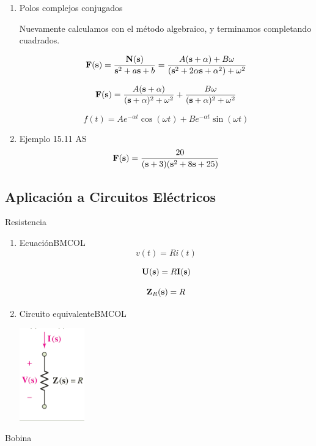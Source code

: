 \begin{enumerate}
\item Polos complejos conjugados
\label{sec:org699cf01}

Nuevamente calculamos con el método algebraico, y terminamos \guillemotleft{}completando cuadrados\guillemotright{}.

\[
  \mathbf{F}(\mathbf{s}) = \frac{\mathbf{N}(\mathbf{s})}{\mathbf{s}^2 + a \mathbf{s} + b} = \frac{A (\mathbf{s} + \alpha) + B \omega}{(\mathbf{s}^2 + 2\alpha \mathbf{s} + \alpha^2) + \omega^2}
\]

\[
  \mathbf{F}(\mathbf{s}) = \frac{A (\mathbf{s} + \alpha)}{(\mathbf{s} + \alpha)^2 + \omega^2} + \frac{B \omega}{(\mathbf{s} + \alpha)^2 + \omega^2}
\]

\[
  f(t) = A e^{- \alpha t} \cos(\omega t) + B e^{- \alpha t} \sin(\omega t)
\]


\item Ejemplo 15.11 AS
\label{sec:org2f09b71}
\[
  \mathbf{F}(\mathbf{s}) = \frac{20}{(\mathbf{s} + 3)(\mathbf{s}^2 + 8 \mathbf{s} + 25)}
\]
\end{enumerate}

\subsection{Aplicación a Circuitos Eléctricos}
\label{sec:orga8a76e5}

{Resistencia}

\begin{enumerate}
\item Ecuación\hfill{}\textsc{BMCOL}
\label{sec:org893f89c}
\[
  v(t) = R i(t)  
\]

\[
  \mathbf{U}(\mathbf{s}) = R \mathbf{I}(\mathbf{s})
\]

\[
  \mathbf{Z}_R(\mathbf{s}) = R
\]

\item Circuito equivalente\hfill{}\textsc{BMCOL}
\label{sec:orgadfee7c}
\begin{center}
\includegraphics[height=4cm]{../figs/Resistencia_Laplace.pdf}
\end{center}
\end{enumerate}

{Bobina}

